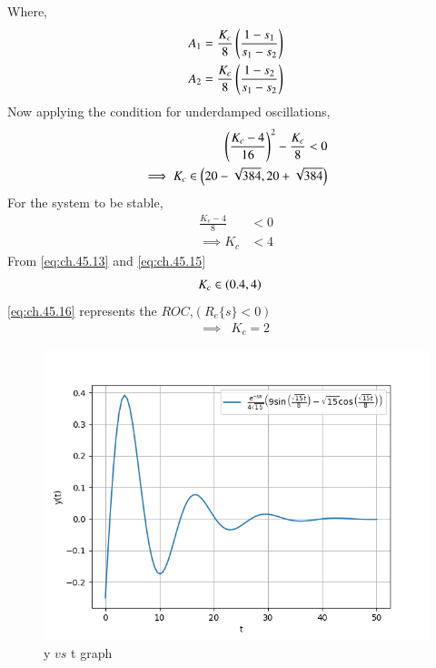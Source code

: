 \documentclass[journal,12pt,twocolumn]{IEEEtran}
\theoremstyle{remark}
\begin{document}
Where,
\begin{align}
    A_1 &= \frac{K_c}{8} \left(\frac{1-s_1}{s_1-s_2}\right)    \\
    A_2 &= \frac{K_c}{8} \left(\frac{1-s_2}{s_1-s_2}\right)    
\end{align}
Now applying the condition for underdamped oscillations,
\begin{align}
    \left(\frac{K_c-4}{16}\right)^2 - \frac{K_c}{8} < 0    \\
    \implies K_c \in \left(20-\sqrt{384} , 20+\sqrt{384}\right)   \label{eq:ch.45.13}
\end{align}
For the system to be stable,
\begin{align}
    \frac{K_c-4}{8}&<0   \\
    \implies K_c&<4 	\label{eq:ch.45.15}
\end{align}
From \eqref{eq:ch.45.13} and \eqref{eq:ch.45.15}
\begin{align}
    &K_c \in \left(0.4,4\right)    \label{eq:ch.45.16}
\end{align}
\eqref{eq:ch.45.16} represents the $ROC$,$(R_e\{s\}<0)$
\begin{align}
    \implies &K_c=2
\end{align}
\begin{figure}[htbp]
    \centering
    \includegraphics[width=\columnwidth]{figs/b.png}
    \caption{y $vs$ t graph}
    \label{fig:ch.45.2}
\end{figure}     
\end{document}
